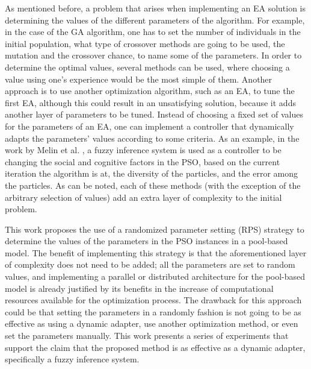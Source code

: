 As mentioned before, a problem that arises when implementing an EA solution is determining the values of the different parameters of the algorithm. For example, in the case of the GA algorithm, one has to set the number of individuals in the initial population, what type of crossover methods are going to be used, the mutation and the crossover chance, to name some of the parameters. In order to determine the optimal values, several methods can be used, where choosing a value using one's experience would be the most simple of them. Another approach is to use another optimization algorithm, such as an EA, to tune the first EA, although this could result in an unsatisfying solution, because it adds another layer of parameters to be tuned. Instead of choosing a fixed set of values for the parameters of an EA, one can implement a controller that dynamically adapts the parameters' values according to some criteria. As an example, in the work by Melin et al. \cite{melin2013optimal},
a fuzzy inference system is used as a controller to be changing the social and cognitive factors in the PSO, based on the current iteration the algorithm is at, the diversity of the particles, and the error among the particles. As can be noted, each of these methods (with the exception of the arbitrary selection of values) add an extra layer of complexity to the initial problem.

This work proposes the use of a randomized parameter setting (RPS) strategy to determine the values of the parameters in the PSO instances in a pool-based model. The benefit of implementing this strategy is that the aforementioned layer of complexity does not need to be added; all the parameters are set to random values, and implementing a parallel or distributed architecture for the pool-based model is already justified by its benefits in the increase of computational resources available for the optimization process. The drawback for this approach could be that setting the parameters in a randomly fashion is not going to be as effective as using a dynamic adapter, use another optimization method, or even set the parameters manually. This work presents a series of experiments that support the claim that the proposed method is as effective as a dynamic adapter, specifically a fuzzy inference system. %

